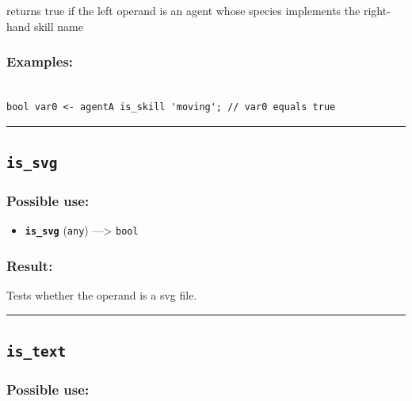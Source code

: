 \documentclass[]{book}
\providecommand{\tightlist}{%
  \setlength{\itemsep}{0pt}\setlength{\parskip}{0pt}}
\theoremstyle{definition}
\theoremstyle{definition}
\theoremstyle{definition}
\theoremstyle{remark}
\begin{document}
returns true if the left operand is an agent whose species implements
the right-hand skill name

\subsubsection{Examples:}\label{examples-217}

\begin{verbatim}
 
bool var0 <- agentA is_skill 'moving'; // var0 equals true
\end{verbatim}

\begin{center}\rule{0.5\linewidth}{\linethickness}\end{center}

\subsection{\texorpdfstring{\texttt{is\_svg}}{is\_svg}}\label{is_svg}

\subsubsection{Possible use:}\label{possible-use-304}

\begin{itemize}
\tightlist
\item
  \textbf{\texttt{is\_svg}} (\texttt{any}) ---\textgreater{}
  \texttt{bool}
\end{itemize}

\subsubsection{Result:}\label{result-294}

Tests whether the operand is a svg file.

\begin{center}\rule{0.5\linewidth}{\linethickness}\end{center}

\subsection{\texorpdfstring{\texttt{is\_text}}{is\_text}}\label{is_text}

\subsubsection{Possible use:}\label{possible-use-305}
\end{document}
